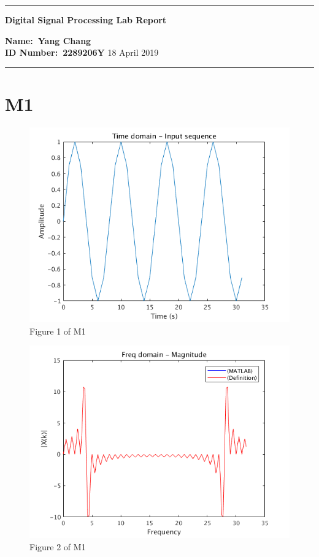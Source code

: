 \documentclass[11pt,a4paper,twoside]{article}
\begin{document}
\begin{center}
\hrule

\vspace{.4cm}
{\bf {\Huge Digital Signal Processing Lab Report}}
\vspace{.2cm}
\end{center}
{\bf Name:\ Yang Chang }  \\
{\bf ID Number:\ 2289206Y} \hspace{\fill} 18 April 2019 \\
\hrule

\section{M1}



\begin{figure}[H]
\centering
\includegraphics[width=0.8\linewidth]{img/m1_1}
\caption{Figure 1 of M1}
\label{Figure 1 of M1}
\end{figure}

\begin{figure}[H]
\centering
\includegraphics[width=0.8\linewidth]{img/m1_2}
\caption{Figure 2 of M1}
\label{Figure 2 of M1}
\end{figure}
\end{document}
